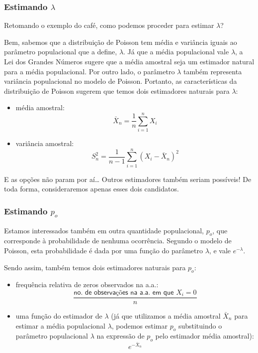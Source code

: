 \documentclass[
]{book}
\theoremstyle{definition}
\theoremstyle{definition}
\theoremstyle{definition}
\theoremstyle{remark}
\begin{document}
\hypertarget{estimando-lambda}{%
\subsubsection*{\texorpdfstring{Estimando \(\lambda\)}{Estimando \textbackslash lambda}}\label{estimando-lambda}}

Retomando o exemplo do café, como podemos proceder para estimar \(\lambda\)?

Bem, sabemos que a distribuição de Poisson tem média e variância iguais ao parâmetro populacional que a define, \(\lambda\). Já que a média populacional vale \(\lambda\), a Lei dos Grandes Números sugere que a média amostral seja um estimador natural para a média populacional. Por outro lado, o parâmetro \(\lambda\) também representa variância populacional no modelo de Poisson. Portanto, as características da distribuição de Poisson sugerem que temos dois estimadores naturais para \(\lambda\):

\begin{itemize}
\item
  média amostral:
  \[\bar{X}_n = \frac{1}{n}\sum_{i=1}^n X_i\]
\item
  variância amostral:
  \[S_n^2 = \frac{1}{n-1}\sum_{i=1}^n (X_i - \bar{X}_n)^2\]
\end{itemize}

E as opções não param por aí\ldots{} Outros estimadores também seriam possíveis! De toda forma, consideraremos apenas esses dois candidatos.

\hypertarget{estimando-p_o}{%
\subsubsection*{\texorpdfstring{Estimando \(p_o\)}{Estimando p\_o}}\label{estimando-p_o}}

Estamos interessados também em outra quantidade populacional, \(p_o\), que corresponde à probabilidade de nenhuma ocorrência. Segundo o modelo de Poisson, esta probabilidade é dada por uma função do parâmetro \(\lambda\), e vale \(e^{-\lambda}\).

Sendo assim, também temos dois estimadores naturais para \(p_o\):

\begin{itemize}
\item
  frequência relativa de zeros observados na a.a.:
  \[\frac{\textsf{no. de observações na a.a. em que }X_i = 0}{n}\]
\item
  uma função do estimador de \(\lambda\) (já que utilizamos a média amostral \(\bar{X}_n\) para estimar a média populacional \(\lambda\), podemos estimar \(p_o\) substituindo o parâmetro populacional \(\lambda\) na expressão de \(p_o\) pelo estimador média amostral):
  \[e^{-\bar{X}_n}\]
\end{itemize}
\end{document}
